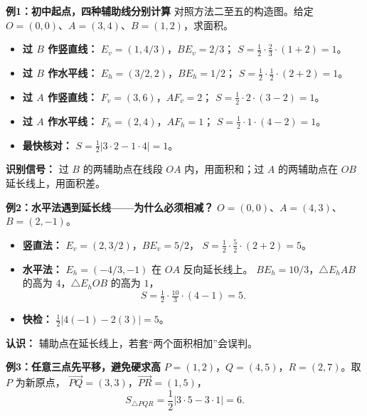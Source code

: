 \begin{examplebox}
\textbf{\textcolor{CExample}{例1：初中起点，四种辅助线分别计算}}
对照方法二至五的构造图。给定 $O=(0,0)$、$A=(3,4)$、$B=(1,2)$，求面积。
\begin{itemize}[leftmargin=*,itemsep=0.2em]
\item \textbf{过 $B$ 作竖直线：} $E_v=(1,4/3)$，$BE_v=2/3$；
$S=\frac12\cdot\frac23\cdot(1+2)=1$。
\item \textbf{过 $B$ 作水平线：} $E_h=(3/2,2)$，$BE_h=1/2$；
$S=\frac12\cdot\frac12\cdot(2+2)=1$。
\item \textbf{过 $A$ 作竖直线：} $F_v=(3,6)$，$AF_v=2$；
$S=\frac12\cdot2\cdot(3-2)=1$。
\item \textbf{过 $A$ 作水平线：} $F_h=(2,4)$，$AF_h=1$；
$S=\frac12\cdot1\cdot(4-2)=1$。
\item \textbf{最快核对：} $S=\frac12|3\cdot2-1\cdot4|=\boxed{1}$。
\end{itemize}
\textbf{识别信号：} 过 $B$ 的两辅助点在线段 $OA$ 内，用面积和；过 $A$ 的两辅助点在 $OB$ 延长线上，用面积差。

\medskip
\textbf{\textcolor{CExample}{例2：水平法遇到延长线——为什么必须相减？}}
$O=(0,0)$、$A=(4,3)$、$B=(2,-1)$。
\begin{itemize}[leftmargin=*,itemsep=0.2em]
\item \textbf{竖直法：} $E_v=(2,3/2)$，$BE_v=5/2$，
$S=\frac12\cdot\frac52\cdot(2+2)=5$。
\item \textbf{水平法：} $E_h=(-4/3,-1)$ 在 $OA$ 反向延长线上。
$BE_h=10/3$，$\triangle E_hAB$ 的高为 $4$，$\triangle E_hOB$ 的高为 $1$，
\[
S=\tfrac12\cdot\tfrac{10}{3}\cdot(4-1)=\boxed{5}.
\]
\item \textbf{快检：} $\tfrac12|4(-1)-2(3)|=5$。
\end{itemize}
\textbf{认识：} 辅助点在延长线上，若套“两个面积相加”会误判。

\medskip
\textbf{\textcolor{CExample}{例3：任意三点先平移，避免硬求高}}
$P=(1,2)$，$Q=(4,5)$，$R=(2,7)$。取 $P$ 为新原点，
$\overrightarrow{PQ}=(3,3)$，$\overrightarrow{PR}=(1,5)$，
\[
 S_{\triangle PQR}=\frac12|3\cdot5-3\cdot1|=\boxed{6}.
\]

\medskip
\end{examplebox}
\clearpage
